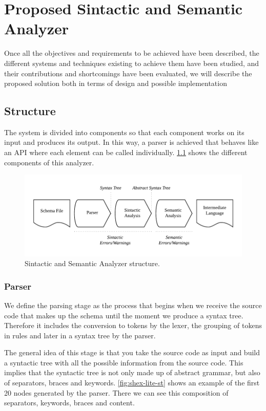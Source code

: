 \chapter{Proposed Sintactic and Semantic Analyzer}
\label{ch:proposed-sintactic-semantic-analyzer}

Once all the objectives and requirements to be achieved have been described,
the different systems and techniques existing to achieve them have been studied,
and their contributions and shortcomings have been evaluated, we will describe
the proposed solution both in terms of design and possible implementation

\section{Structure}
The system is divided into components so that each component works on its input
and produces its output. In this way, a parser is achieved that behaves like
an API where each element can be called individually. \cref{fig:shex-lite-sema}
shows the different components of this analyzer.

\begin{figure}
    \includegraphics[width=\textwidth]{images/sin-sem-structure.pdf}
    \centering
    \caption[Sintactic and Semantic Analyzer structure]{Sintactic and Semantic Analyzer structure.}
    \label{fig:shex-lite-sema}
\end{figure}

\subsection{Parser}
We define the parsing stage as the process that begins when we receive the source code that makes up
the schema until the moment we produce a syntax tree. Therefore it includes the conversion to tokens
by the lexer, the grouping of tokens in rules and later in a syntax tree by the parser.

The general idea of this stage is that you take the source code as input and build a syntactic tree with all
the possible information from the source code. This implies that the syntactic tree is not only made up of
abstract grammar, but also of separators, braces and keywords. \cref{fig:shex-lite-st} shows an example
of the first 20 nodes generated by the parser. There we can see this composition of separators, keywords, braces
and content.

